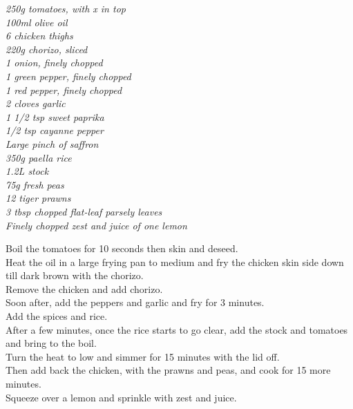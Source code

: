 \documentclass{tufte-book}
\begin{document}
\smallskip
\emph{250g tomatoes, with x in top
\\100ml olive oil
\\6 chicken thighs
\\220g chorizo, sliced
\\1 onion, finely chopped
\\1 green pepper, finely chopped
\\1 red pepper, finely chopped
\\2 cloves garlic
\\1 1/2 tsp sweet paprika
\\1/2 tsp cayanne pepper
\\Large pinch of saffron
\\350g paella rice
\\1.2L stock
\\75g fresh peas
\\12 tiger prawns
\\3 tbsp chopped flat-leaf parsely leaves
\\Finely chopped zest and juice of one lemon
}

\smallskip
Boil the tomatoes for 10 seconds then skin and deseed.
\\Heat the oil in a large frying pan to medium and fry the chicken skin side down till dark brown with the chorizo.
\\Remove the chicken and add chorizo.
\\Soon after, add the peppers and garlic and fry for 3 minutes.
\\Add the spices and rice.
\\After a few minutes, once the rice starts to go clear, add the stock and tomatoes and bring to the boil.
\\Turn the heat to low and simmer for 15 minutes with the lid off.
\\Then add back the chicken, with the prawns and peas, and cook for 15 more minutes.
\\Squeeze over a lemon and sprinkle with zest and juice.

\end{document}
